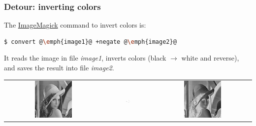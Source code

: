 \documentclass[english,serif,mathserif,xcolor=pdftex,dvipsnames,table]{beamer}
\begin{document}
\begin{frame}[fragile]
  \frametitle{Detour: inverting colors}
  The \href{http://www.imagemagick.org}{ImageMagick}
  command to invert colors is:
  \begin{lstlisting}[language=sh]
    $ convert @\emph{image1}@ +negate @\emph{image2}@
  \end{lstlisting}%
  
  \+ 
  It reads the image in file \emph{image1}, inverts colors (black
  $\to$ white and reverse), and saves the result into file
  \emph{image2}.

  \+
  \begin{tabular}[c]{ccc}
    \includegraphics[width=0.4\textwidth]{fig/lena_gray}
    &
    \includegraphics[width=0.1\textwidth]{fig/arrow}
    &
    \includegraphics[width=0.4\textwidth]{fig/lena_negative}
  \end{tabular}
\end{frame}
\end{document}
